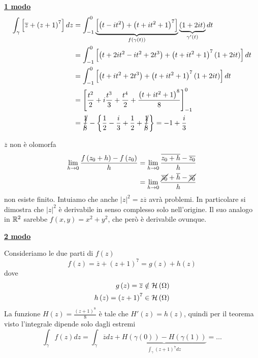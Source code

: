 \textbf{\underline{1 modo}}
\begin{align*}
\int\nolimits_{\gamma}\left[\overline{z} + \left(z + 1\right)^{7}\right] dz & = \int\nolimits^{0}_{- 1}\underbrace{\left[\left(t - it^{2}\right) + \left(t + it^{2} + 1\right)^{7}\right]}_{f\left(\gamma \left(t\right)\right)}\underbrace{\left(1 + 2it\right)}_{\gamma '\left(t\right)} dt\\
 & = \int\nolimits^{0}_{- 1}\left[\left(t + 2it^{2} - it^{2} + 2t^{3}\right) + \left(t + it^{2} + 1\right)^{7}\left(1 + 2it\right)\right] dt\\
 & = \int\nolimits^{0}_{- 1}\left[\left(t + it^{2} + 2t^{3}\right) + \left(t + it^{2} + 1\right)^{7}\left(1 + 2it\right)\right] dt\\
 & = \left[\frac{t^{2}}{2} + i\frac{t^{3}}{3} + \frac{t^{4}}{2} + \frac{\left(t + it^{2} + 1\right)^{8}}{8}\right]^{0}_{- 1}\\
 & = \cancel{\frac{1}{8}} - \left\{\frac{1}{2} - \frac{i}{3} + \frac{1}{2} + \cancel{\frac{1}{8}}\right\} = - 1 + \frac{i}{3}
\end{align*}
\begin{rem}
$\overline{z}$ non è olomorfa
\begin{align*}
\lim\limits_{h\rightarrow 0}\frac{f\left(z_{0} + h\right) - f\left(z_{0}\right)}{h} & = \lim\limits_{h\rightarrow 0}\frac{\overline{z_{0} + h} - \overline{z_{0}}}{h}\\
 & = \lim\limits_{h\rightarrow 0}\frac{\cancel{\overline{z_{0}}} + \overline{h} - \cancel{\overline{z_{0}}}}{h}
\end{align*}
non esiste finito. Intuiamo che anche $\left| z\right|^{2} = z\overline{z}$ avrà problemi. In particolare si dimostra che $\left| z\right|^{2}$ è derivabile in senso complesso solo nell'origine. Il suo analogo in $\mathbb{R}^{2}$ sarebbe $f\left(x, y\right) = x^{2} + y^{2}$, che però è derivabile ovunque.
\end{rem}
\textbf{\underline{2 modo}}

Consideriamo le due parti di $f\left(z\right)$
\begin{equation*}
f\left(z\right) = \overline{z} + \left(z + 1\right)^{7} = g\left(z\right) + h\left(z\right)
\end{equation*}
dove
\begin{equation*}
\begin{aligned}
g\left(z\right) = \overline{z} & \notin \mathcal{H} \left(\Omega \right)\\
h\left(z\right) = \left(z + 1\right)^{7} & \in \mathcal{H} \left(\Omega \right)
\end{aligned}
\end{equation*}
La funzione $H\left(z\right) = \frac{\left(z + 1\right)^{8}}{8}$ è tale che $H'\left(z\right) = h\left(z\right)$, quindi per il teorema visto l'integrale dipende solo dagli estremi
\begin{equation*}
\int\nolimits_{\gamma} f\left(z\right) dz = \int\nolimits_{\gamma}\overline{z} dz + \underbrace{H\left(\gamma \left(0\right)\right) - H\left(\gamma \left(1\right)\right)}_{\int\nolimits_{\gamma}\left(z + 1\right)^{7} dz} = \dotsc 
\end{equation*}
\Soluzione

